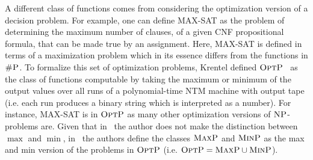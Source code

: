 A different class of functions comes from considering the optimization version of a decision problem. For example, one can define MAX-SAT as the problem of determining the maximum number of clauses, of a given CNF propositional formula, that can be made true by an assignment. Here, MAX-SAT is defined in terms of a maximization problem which in its essence differs from the functions in $\text{\sc \#P}$. 
To formalize this set of optimization problems, Krentel defined $\text{\sc OptP}$~\cite{krentel1988complexity} as the class of functions computable by taking the maximum or minimum of the output values over all runs of a polynomial-time NTM machine with output tape (i.e. each run produces a binary string which is interpreted as a number). 
For instance, MAX-SAT is in $\text{\sc OptP}$ as many other optimization versions of $\text{\sc NP}$-problems are.
Given that in~\cite{krentel1988complexity} the author does not make the distinction between $\max$ and $\min$, in~\cite{vollmer1995complexity} the authors define the classes $\text{\sc MaxP}$ and $\text{\sc MinP}$ as the max and min version of the problems in $\text{\sc OptP}$ (i.e. $\text{\sc OptP} = \text{\sc MaxP} \cup \text{\sc MinP}$).


